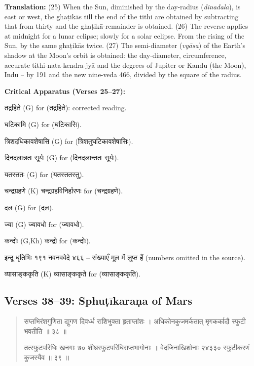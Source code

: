 \documentclass[11pt,a4paper]{article}
\newcommand{\dev}[1]{{\devanagarifont #1}}
\newenvironment{sanskritverse}{%
  \begin{quote}%
  \devanagarifont%
  \setlength{\leftmargin}{2em}%
}{\end{quote}}
\newenvironment{variants}{%
  \small%
  \color{varecolor}%
  \list{}{\leftmargin=2em\itemindent=-1em}%
}{\endlist}
\begin{document}
\textbf{Translation:} (25) When the Sun, diminished by the day-radius (\textit{dinadala}), 
is east or west, the ghaṭikās till the end of the tithi are obtained by subtracting 
that from thirty and the ghaṭikā-remainder is obtained. (26) The reverse applies at 
midnight for a lunar eclipse; slowly for a solar eclipse. From the rising of the 
Sun, by the same ghaṭikās twice. (27) The semi-diameter (\textit{vyāsa}) of the 
Earth's shadow at the Moon's orbit is obtained: the day-diameter, circumference, 
accurate tithi-nata-kendra-jyā and the degrees of Jupiter or Kandu (the Moon), 
Indu -- by 191 and the new nine-veda 466, divided by the square of the radius.

\vspace{0.3cm}
\textcolor{varecolor}{\textbf{Critical Apparatus (Verses 25--27):}}
\begin{variants}
\item[25.] \dev{तद्रहिते} (G) \dev{for} (\dev{तद्रहिते}): corrected reading.
\item[25.1] \dev{घटिकामि} (G) \dev{for} (\dev{घटिकासि}).
\item[25.2] \dev{त्रिशदधिकावशेषासि} (G) \dev{for} (\dev{त्रिशतुघटिकावशेषासिः}).
\item[25.3] \dev{दिनदलान्नतः सूर्यः} (G) \dev{for} (\dev{दिनदलान्ततः सूर्यः}).
\item[26.1] \dev{यतस्ततः} (G) \dev{for} (\dev{यतस्ततस्तु}).
\item[26.2] \dev{चन्द्रग्रहणे} (K) \dev{चन्द्रग्रहविनिर्हारणः} \dev{for} (\dev{चन्द्रग्रहणे}).
\item[27.1] \dev{दल} (G) \dev{for} (\dev{दल}).
\item[27.2] \dev{ज्या} (G) \dev{ज्यावधो} \dev{for} (\dev{ज्यावधो}).
\item[27.3] \dev{कन्दोः} (G,Kh) \dev{कन्द्रो} \dev{for} (\dev{कन्दोः}).
\item[27.4] \dev{इन्दू धृतिभिः १९१ नवनववेदे ४६६} -- \dev{संख्याएँ मूल में लुप्त हैं} (numbers omitted in the source).
\item[27.5] \dev{व्यासाङ्ककृति} (K) \dev{व्यासाङ्ककृते} \dev{for} (\dev{व्यासाङ्ककृति}).
\end{variants}

\subsection*{Verses 38--39: Sphuṭīkaraṇa of Mars}

\begin{sanskritverse}
\dev{सप्तभिरंशगुणिता द्युगण दिवर्ध्ध राशिभुक्ता हृताप्तांशः} ।
\dev{अधिकोनकुजमर्कतात् मृगकर्कादौ स्फुटी भवतीति ॥ ३८ ॥}

\dev{तत्स्फुटपरिधिः खनगाः ७० शीघ्रस्फुटपरिधिराप्तभागोनाः} ।
\dev{वेदजिनाखिशोनाः २४३३० स्फुटीकरणं कुजस्यैव ॥ ३९ ॥}
\end{sanskritverse}
\end{document}
